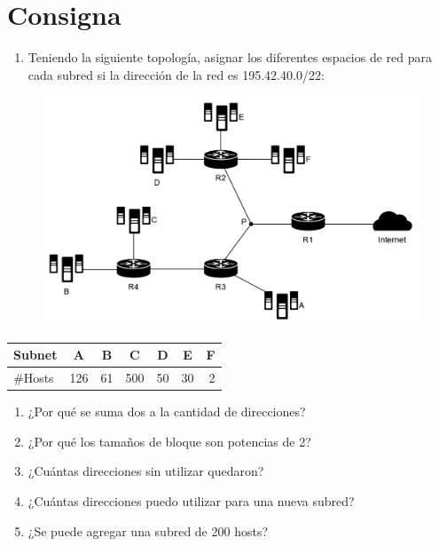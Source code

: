\section*{Consigna}

\begin{enumerate}[left=0cm]
    \item Teniendo la siguiente topología, asignar los diferentes espacios de red para cada subred si la dirección de la red es 195.42.40.0/22:
\end{enumerate}

\vspace{-\baselineskip}
\begin{figure}[H]
    \centering
    \includegraphics[width=1\linewidth]{Images/topologia.png}
\end{figure}

\vspace{-\baselineskip}
\begin{table}[H]
    \centering
    \begin{tabular}{|l|c|c|c|c|c|c|}
    \hline
    \multicolumn{1}{|c|}{Subnet} & A & B & C & D & E & F \\ \hline
    \#Hosts & \multicolumn{1}{r|}{126} & \multicolumn{1}{r|}{61} & \multicolumn{1}{r|}{500} & \multicolumn{1}{r|}{50} & \multicolumn{1}{r|}{30} & \multicolumn{1}{r|}{2} \\ \hline
    \end{tabular}
\end{table}

\begin{enumerate}[start=2, left=0cm]
    \item ¿Por qué se suma dos a la cantidad de direcciones?
    \item ¿Por qué los tamaños de bloque son potencias de 2?
    \item ¿Cuántas direcciones sin utilizar quedaron?
    \item ¿Cuántas direcciones puedo utilizar para una nueva subred?
    \item ¿Se puede agregar una subred de 200 hosts?
\end{enumerate}